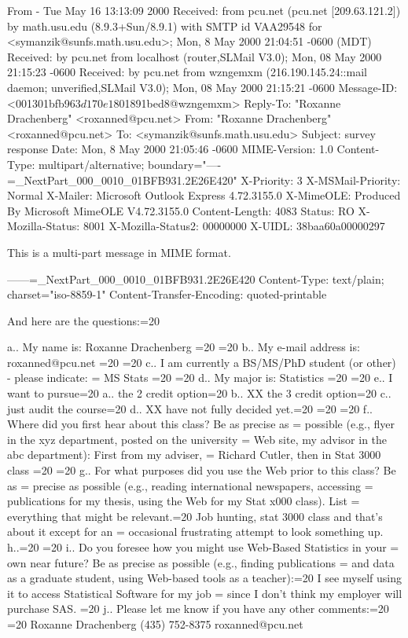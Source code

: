 From - Tue May 16 13:13:09 2000
Received: from pcu.net (pcu.net [209.63.121.2])
	by math.usu.edu (8.9.3+Sun/8.9.1) with SMTP id VAA29548
	for <symanzik@sunfs.math.usu.edu>; Mon, 8 May 2000 21:04:51 -0600 (MDT)
Received: by pcu.net from localhost
    (router,SLMail V3.0); Mon, 08 May 2000 21:15:23 -0600
Received: by pcu.net from wzngemxm
    (216.190.145.24::mail daemon; unverified,SLMail V3.0); Mon, 08 May 2000 21:15:21 -0600
Message-ID: <001301bfb963$d170e180$1891bed8@wzngemxm>
Reply-To: "Roxanne Drachenberg" <roxanned@pcu.net>
From: "Roxanne Drachenberg" <roxanned@pcu.net>
To: <symanzik@sunfs.math.usu.edu>
Subject: survey response
Date: Mon, 8 May 2000 21:05:46 -0600
MIME-Version: 1.0
Content-Type: multipart/alternative;
	boundary="----=_NextPart_000_0010_01BFB931.2E26E420"
X-Priority: 3
X-MSMail-Priority: Normal
X-Mailer: Microsoft Outlook Express 4.72.3155.0
X-MimeOLE: Produced By Microsoft MimeOLE V4.72.3155.0
Content-Length: 4083
Status: RO
X-Mozilla-Status: 8001
X-Mozilla-Status2: 00000000
X-UIDL: 38baa60a00000297

This is a multi-part message in MIME format.

------=_NextPart_000_0010_01BFB931.2E26E420
Content-Type: text/plain;
	charset="iso-8859-1"
Content-Transfer-Encoding: quoted-printable

And here are the questions:=20

    a.. My name is: Roxanne Drachenberg
   =20
   =20
    b.. My e-mail address is: roxanned@pcu.net
   =20
   =20
    c.. I am currently a BS/MS/PhD student (or other) - please indicate: =
MS Stats
   =20
   =20
    d.. My major is: Statistics
   =20
   =20
    e.. I want to pursue=20
        a.. the 2 credit option=20
        b.. XX the 3 credit option=20
        c.. just audit the course=20
        d.. XX have not fully decided yet.=20
   =20
   =20
    f.. Where did you first hear about this class? Be as precise as =
possible (e.g., flyer in the xyz department, posted on the university =
Web site, my advisor in the abc department): First from my adviser, =
Richard Cutler, then in Stat 3000 class
   =20
   =20
    g.. For what purposes did you use the Web prior to this class? Be as =
precise as possible (e.g., reading international newspapers, accessing =
publications for my thesis, using the Web for my Stat x000 class). List =
everything that might be relevant.=20
    Job hunting, stat 3000 class and that's about it except for an =
occasional frustrating attempt to look something up.
    h..=20
   =20
    i.. Do you foresee how you might use Web-Based Statistics in your =
own near future? Be as precise as possible (e.g., finding publications =
and data as a graduate student, using Web-based tools as a teacher):=20
    I see myself using it to access Statistical Software for my job =
since I don't think my employer will purchase SAS.
   =20
    j.. Please let me know if you have any other comments:=20
   =20
Roxanne Drachenberg
(435) 752-8375
roxanned@pcu.net

